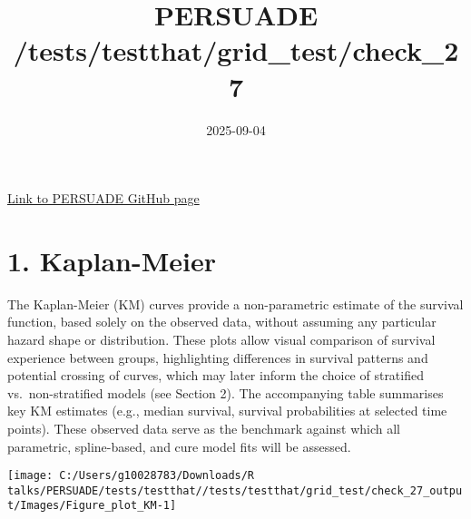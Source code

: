 \documentclass[
]{article}
\title{PERSUADE /tests/testthat/grid\_test/check\_27}
\author{}
\date{\vspace{-2.5em}2025-09-04}
\begin{document}
\maketitle

{
\hypersetup{linkcolor=}
\setcounter{tocdepth}{2}
\tableofcontents
}
\hfill\break

\href{https://github.com/Bram-R/PERSUADE}{Link to PERSUADE GitHub page}

\clearpage

\section{1. Kaplan-Meier}\label{kaplan-meier}

The Kaplan-Meier (KM) curves provide a non-parametric estimate of the
survival function, based solely on the observed data, without assuming
any particular hazard shape or distribution. These plots allow visual
comparison of survival experience between groups, highlighting
differences in survival patterns and potential crossing of curves, which
may later inform the choice of stratified vs.~non-stratified models (see
Section 2). The accompanying table summarises key KM estimates (e.g.,
median survival, survival probabilities at selected time points). These
observed data serve as the benchmark against which all parametric,
spline-based, and cure model fits will be assessed.

\clearpage

\begin{flushleft}\texttt{[image: C:/Users/g10028783/Downloads/R talks/PERSUADE/tests/testthat//tests/testthat/grid\_test/check\_27\_output/Images/Figure\_plot\_KM-1]} \end{flushleft}

\begin{table}[H]
\centering
\caption{\label{tab:Table_1}Observed survival data}
\centering
{}
\end{table}
\end{document}
